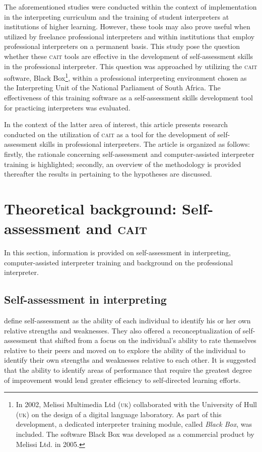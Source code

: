 \documentclass[output=paper]{langsci/langscibook}
\begin{document}
The aforementioned studies were conducted within the context of implementation in the interpreting curriculum and the training of student interpreters at institutions of higher learning. However, these tools may also prove useful when utilized by freelance professional interpreters and within institutions that employ professional interpreters on a permanent basis. This study pose the question whether these \textsc{cait} tools are effective in the development of self-assessment skills in the professional interpreter. This question was approached by utilizing the \textsc{cait} software, Black Box\footnote{In 2002, Melissi Multimedia Ltd (\textsc{uk}) collaborated with the University of Hull (\textsc{uk}) on the design of a digital language laboratory. As part of this development, a dedicated interpreter training module, called \textit{Black Box}, was included. The software Black Box was developed as a commercial product by Melissi Ltd. in 2005.}, within a professional interpreting environment chosen as the Interpreting Unit of the National Parliament of South Africa. The effectiveness of this training software as a self-assessment skills development tool for practicing interpreters was evaluated. 

In the context of the latter area of interest, this article presents research conducted on the utilization of \textsc{cait} as a tool for the development of self-assessment skills in professional interpreters. The article is organized as follows: firstly, the rationale concerning self-assessment and computer-assisted interpreter training is highlighted; secondly, an overview of the methodology is provided thereafter the results in pertaining to the hypotheses are discussed.

\section{Theoretical background: Self-assessment and \textsc{cait}}

In this section, information is provided on self-assessment in interpreting, com\-puter-assisted interpreter training and background on the professional interpret\-er.

\subsection{Self-assessment in interpreting}

\citet[74]{Regehr1996} define self-assessment as the ability of each individual to identify his or her own relative strengths and weaknesses. They also offered a reconceptualization of self-assessment that shifted from a focus on the individual’s ability to rate themselves relative to their peers and moved on to explore the ability of the individual to identify their own strengths and weaknesses relative to each other. It is suggested that the ability to identify areas of performance that require the greatest degree of improvement would lend greater efficiency to self-directed learning efforts.
\end{document}
